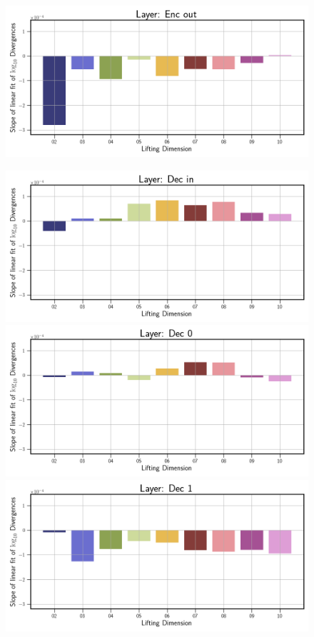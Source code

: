 \begin{figure}[!htbp]
\begin{minipage}{.5\textwidth}
        \includegraphics[width=\textwidth]{"../Figures/van_der_pol_slope_linear_fit_enc_out.png"} 
    \end{minipage}%
    \begin{minipage}{.5\textwidth}
        \includegraphics[width=\textwidth]{"../Figures/van_der_pol_slope_linear_fit_dec_in.png"} 
        \includegraphics[width=\textwidth]{"../Figures/van_der_pol_slope_linear_fit_dec_0.png"} 
        \includegraphics[width=\textwidth]{"../Figures/van_der_pol_slope_linear_fit_dec_1.png"} 

\end{minipage}
\end{figure}
